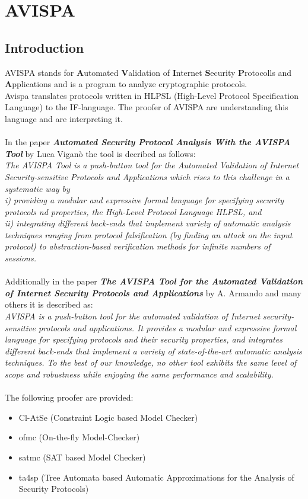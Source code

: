 \chapter{AVISPA}
\section{Introduction}
AVISPA stands for \textbf{A}utomated \textbf{V}alidation of \textbf{I}nternet \textbf{S}ecurity \textbf{P}rotocolls and \textbf{A}pplications and is a program to analyze cryptographic protocols.\\
Avispa translates protocols written in HLPSL (High-Level Protocol Specification Language) to the IF-language. The proofer of AVISPA are understanding this language and are interpreting it.\\
\\
In the paper \textit{\textbf{Automated Security Protocol Analysis With the AVISPA Tool}} by Luca Viganò the tool is decribed as follows:\\
\textit{The AVISPA Tool is a push-button tool for the Automated Validation of Internet Security-sensitive Protocols and Applications which rises to this challenge in a systematic way by\\
i)  providing a modular and expressive formal language for specifying security protocols nd properties, the High-Level Protocol Language HLPSL, and\\
ii) integrating different back-ends that implement variety of automatic analysis techniques ranging from protocol falsification (by finding an attack on the input protocol) to abstraction-based verification methods for infinite numbers of sessions.}\\
\\
Additionally in the paper \textit{\textbf{The AVISPA Tool for the Automated Validation of Internet Security Protocols and Applications}} by A. Armando and many others it is described as:\\
\textit{AVISPA is a push-button tool for the automated validation of Internet security-sensitive protocols and applications. It provides a modular and expressive formal language for specifying protocols and their security properties, and integrates different back-ends that implement a variety of state-of-the-art automatic analysis techniques. To the best of our knowledge, no other tool exhibits the same level of scope and robustness while enjoying the same performance and scalability.}\\
\\
The following proofer are provided:
\begin{itemize}
\item Cl-AtSe (Constraint Logic based Model Checker)
\item ofmc (On-the-fly Model-Checker)
\item satmc (SAT based Model Checker)
\item ta4sp (Tree Automata based Automatic Approximations for the Analysis of Security Protocols)
\end{itemize}

